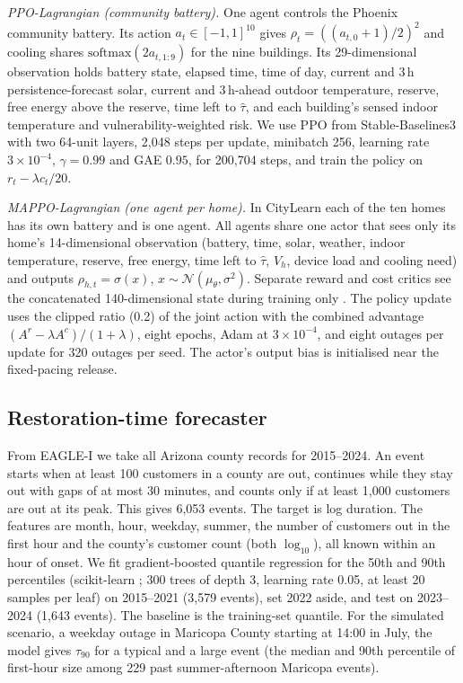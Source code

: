 \documentclass[conference]{IEEEtran}
\begin{document}
\emph{PPO-Lagrangian (community battery).} One agent controls the Phoenix community battery. Its action $a_t\in[-1,1]^{10}$ gives $\rho_t=((a_{t,0}+1)/2)^2$ and cooling shares $\mathrm{softmax}(2a_{t,1:9})$ for the nine buildings. Its 29-dimensional observation holds battery state, elapsed time, time of day, current and 3\,h persistence-forecast solar, current and 3\,h-ahead outdoor temperature, reserve, free energy above the reserve, time left to $\hat\tau$, and each building's sensed indoor temperature and vulnerability-weighted risk. We use PPO \cite{schulman2017ppo} from Stable-Baselines3 \cite{raffin2021sb3} with two 64-unit layers, 2,048 steps per update, minibatch 256, learning rate $3\times10^{-4}$, $\gamma=0.99$ and GAE $0.95$, for 200,704 steps, and train the policy on $r_t-\lambda c_t/20$.

\emph{MAPPO-Lagrangian (one agent per home).} In CityLearn each of the ten homes has its own battery and is one agent. All agents share one actor that sees only its home's 14-dimensional observation (battery, time, solar, weather, indoor temperature, reserve, free energy, time left to $\hat\tau$, $V_h$, device load and cooling need) and outputs $\rho_{h,t}=\sigma(x)$, $x\sim\mathcal{N}(\mu_\theta,\sigma^2)$. Separate reward and cost critics see the concatenated 140-dimensional state during training only \cite{yu2022mappo}. The policy update uses the clipped ratio (0.2) of the joint action with the combined advantage $(A^r-\lambda A^c)/(1+\lambda)$, eight epochs, Adam at $3\times10^{-4}$, and eight outages per update for 320 outages per seed. The actor's output bias is initialised near the fixed-pacing release.

\subsection{Restoration-time forecaster}
From EAGLE-I \cite{brelsford2024eaglei} we take all Arizona county records for 2015--2024. An event starts when at least 100 customers in a county are out, continues while they stay out with gaps of at most 30 minutes, and counts only if at least 1,000 customers are out at its peak. This gives 6,053 events. The target is log duration. The features are month, hour, weekday, summer, the number of customers out in the first hour and the county's customer count (both $\log_{10}$), all known within an hour of onset. We fit gradient-boosted quantile regression \cite{friedman2001gbm,koenker1978quantile} for the 50th and 90th percentiles (scikit-learn \cite{pedregosa2011sklearn}; 300 trees of depth 3, learning rate 0.05, at least 20 samples per leaf) on 2015--2021 (3,579 events), set 2022 aside, and test on 2023--2024 (1,643 events). The baseline is the training-set quantile. For the simulated scenario, a weekday outage in Maricopa County starting at 14:00 in July, the model gives $\tau_{90}$ for a typical and a large event (the median and 90th percentile of first-hour size among 229 past summer-afternoon Maricopa events).
\end{document}
